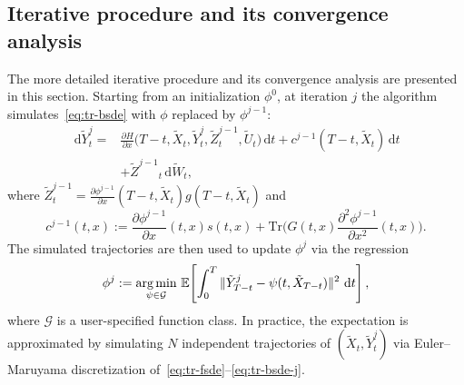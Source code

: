 \documentclass[letterpaper, 10 pt, conference]{ieeeconf}  %
\def\argmin{\mathop{\text{\rm arg\,min}}}
\newcommand{\trace}{\text{Tr}}
\newcommand{\ud}{\,\mathrm{d}}
\def\argmin{\mathop{\text{\rm arg\,min}}}
\newcommand{\Xr}{\tilde X}
\newcommand{\Ur}{\tilde U}
\newcommand{\Yr}{\tilde Y}
\newcommand{\Zr}{\tilde Z}
\begin{document}
\subsection{Iterative procedure and its convergence analysis}\label{sec:convergence}
The more detailed iterative procedure and its convergence analysis are presented in this section.
Starting from an initialization $\phi^0$, at 
iteration $j$ the algorithm simulates~\eqref{eq:tr-bsde} with $\phi$ 
replaced by $\phi^{j-1}$:
\begin{align}\nonumber
    \ud \Yr^j_t = &\frac{\partial H}{\partial x}\big(T\!-\!t,\Xr_t,\Yr^j_t,\Zr^{j-1}_t,\Ur_t\big)\ud t \!+\! c^{j-1}(T\!-\!t,\Xr_t)\ud t \\&+ {\Zr^{j-1}}_t \ud \tilde W_t,\label{eq:tr-bsde-j}
\end{align}
where $\Zr^{j-1}_t = \frac{\partial \phi^{j-1}}{\partial  x}(T-t,\Xr_t)g(T-t,\Xr_t)$ and  \[c^{j-1}(t,x):=\frac{\partial \phi^{j-1}}{\partial x}(t,x) s (t,x) +\trace\big(G(t,x)\frac{\partial^2\phi^{j-1}}{\partial x^2}(t,x)\big).\]
The simulated trajectories are then used to update $\phi^j$ via the regression
\begin{equation}\label{eq:phi-j}
    \phi^j := \argmin_{\psi \in \mathcal{G}}\, \mathbb{E}\!\left[\int_0^T
    \|\tilde{Y}^j_{T-t} - \psi(t,\tilde{X}_{T-t})\|^2\,\ud t\right],
\end{equation}
where $\mathcal{G}$ is a user-specified function class. In practice, the 
expectation is approximated by simulating $N$ independent trajectories of 
$(\tilde{X}_t, \tilde{Y}^j_t)$ via Euler--Maruyama discretization 
of~\eqref{eq:tr-fsde}--\eqref{eq:tr-bsde-j}.
\end{document}
